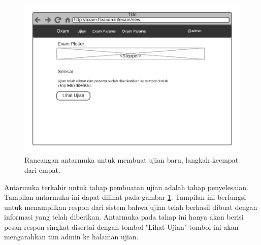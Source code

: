     
    \begin{figure}
        \centering
        \includegraphics{Gambar/mockups/Mockup--Admin - NewExam-Step 4.pdf}
        \caption{Rancangan antarmuka untuk membuat ujian baru, langkah keempat dari empat.}
        \label{fig:mockup_admin_exam_create-4}
    \end{figure}
    Antarmuka terkahir untuk tahap pembuatan ujian adalah tahap penyelesaian. Tampilan antarmuka ini dapat dilihat
    pada gambar \ref{fig:mockup_admin_exam_create-4}. Tampilan ini berfungsi untuk menampilkan respon dari sistem
    bahwa ujian telah berhasil dibuat dengan informasi yang telah diberikan. Antarmuka pada tahap ini hanya akan
    berisi pesan respon singkat disertai dengan tombol "Lihat Ujian" tombol ini akan mengarahkan tim admin ke
    halaman ujian.
    
